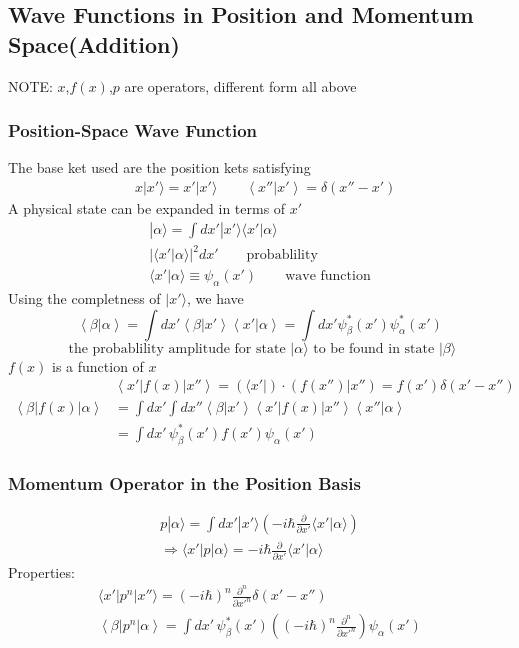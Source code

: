 \documentclass[a4paper,12pt]{article}
\begin{document}
\subsection{Wave Functions in Position and Momentum Space(Addition)}
NOTE: \(x\),\(f(x)\),\(p\) are operators, different form all above
\subsubsection{Position-Space Wave Function}
The base ket used are the position kets satisfying
\[\begin{aligned}
       & x|x'\rangle = x'|x'\rangle \qquad
       \left\langle x''|x' \right\rangle = \delta(x''-x')
\end{aligned}\]
A physical state can be expanded in terms of \(x'\)
\[\begin{aligned}
       |\alpha\rangle=\int dx' |x'\rangle\langle x'|\alpha\rangle \\
       |\langle x'|\alpha\rangle|^2dx' \qquad\text{probablility} \\
       \langle x'|\alpha\rangle \equiv \psi_\alpha(x') \qquad\text{wave function}
\end{aligned}\]
Using the completness of \(|x'\rangle\), we have\[                                                                      
       \left\langle \beta|\alpha \right\rangle = \int dx'\left\langle \beta|x'\right\rangle\left\langle x'|\alpha\right\rangle  
       = \int dx'\psi^*_\beta(x')\psi^*_\alpha(x')  \] 
       \[\text{ the probablility amplitude for state } |\alpha\rangle \text{ to be found in state }|\beta\rangle\]
\(f(x)\) is a function of \(x\)
       \[\begin{aligned}
       &\left\langle x'|f(x)|x''\right\rangle = (\langle x'|)\cdot(f(x'')|x'') = f(x')\delta(x'-x'')\\ 
       \left\langle \beta|f(x)|\alpha\right\rangle &=\int dx'\int dx'' \left\langle \beta|x'\right\rangle \left\langle x'|f(x)|x''\right\rangle \left\langle x''|\alpha\right\rangle \\
                                                 &= \int dx'\,\psi_\beta^*(x')f(x')\psi_\alpha(x')
\end{aligned}\]
\subsubsection{Momentum Operator in the Position Basis}
\[\begin{aligned}
       p|\alpha\rangle = \int dx'|x'\rangle\left(-i\hbar\frac{\partial}{\partial x'}\langle x'|\alpha \rangle\right) \\
       \Rightarrow \langle x'|p|\alpha\rangle = -i\hbar\frac{\partial}{\partial x'}\langle x'|\alpha \rangle
\end{aligned}\]
Properties:
\[\begin{aligned}
       \langle x'|p^n|x''\rangle = (-i\hbar)^n\frac{\partial^n}{\partial x'^n}\delta(x'-x'')   \\
       \left\langle \beta|p^n |\alpha\right\rangle = \int dx'\,\psi_\beta^*(x')\left((-i\hbar)^n\frac{\partial^n}{\partial x'^n}\right) \psi_\alpha(x')
\end{aligned}\]
\end{document}
